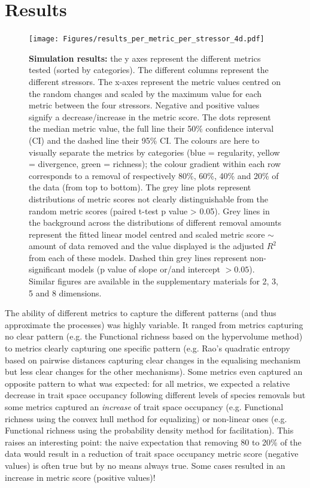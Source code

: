 \documentclass[12pt,letterpaper]{article}
\begin{document}
\section{Results}


\begin{figure}[!htbp]
\centering
   \texttt{[image: Figures/results\_per\_metric\_per\_stressor\_4d.pdf]}
\caption{\scriptsize{\textbf{Simulation results:} the y axes represent the different metrics tested (sorted by categories).
The different columns represent the different stressors. The x-axes represent the metric values centred on the random changes and scaled by the maximum value for each metric between the four stressors.
Negative and positive values signify a decrease/increase in the metric score.
The dots represent the median metric value, the full line their 50\% confidence interval (CI) and the dashed line their 95\% CI.
The colours are here to visually separate the metrics by categories (blue = regularity, yellow = divergence, green = richness); the colour gradient within each row corresponds to a removal of respectively 80\%, 60\%, 40\% and 20\% of the data (from top to bottom).
The grey line plots represent distributions of metric scores not clearly distinguishable from the random metric scores (paired t-test p value > 0.05).
Grey lines in the background across the distributions of different removal amounts represent the fitted linear model centred and scaled metric score $\sim$ amount of data removed and the value displayed is the adjusted $R^2$ from each of these models.
Dashed thin grey lines represent non-significant models (p value of slope or/and intercept $> 0.05$).
Similar figures are available in the supplementary materials for 2, 3, 5 and 8 dimensions.}}
\label{Fig:simulation_results}
\end{figure}
\bigskip

The ability of different metrics to capture the different patterns (and thus approximate the processes) was highly variable.
It ranged from metrics capturing no clear pattern (e.g. the Functional richness based on the hypervolume method) to metrics clearly capturing one specific pattern (e.g. Rao’s quadratic entropy based on pairwise distances capturing clear changes in the equalising mechanism but less clear changes for the other mechanisms).
Some metrics even captured an opposite pattern to what was expected: for all metrics, we expected a relative decrease in trait space occupancy following different levels of species removals but some metrics captured an \textit{increase} of trait space occupancy (e.g.
Functional richness using the convex hull method for equalizing) or non-linear ones (e.g. Functional richness using the probability density method for facilitation).
This raises an interesting point: the naive expectation that removing 80 to 20\% of the data would result in a reduction of trait space occupancy metric score (negative values) is often true but by no means always true.
Some cases resulted in an increase in metric score (positive values)!
\end{document}
